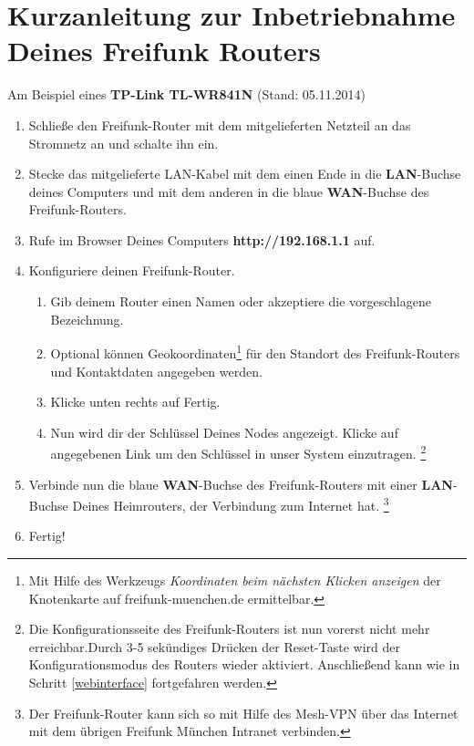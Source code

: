 \documentclass{article}
\newcommand{\changefont}[3]{
\fontfamily{#1} \fontseries{#2} \fontshape{#3} \selectfont}
\begin{document}
\changefont{phv}{m}{n}



\section*{Kurzanleitung zur Inbetriebnahme Deines Freifunk Routers}
Am Beispiel eines \textbf{TP-Link TL-WR841N} (Stand: 05.11.2014)

\begin{enumerate}
\item Schließe den Freifunk-Router mit dem mitgelieferten Netzteil an das 
    Stromnetz an und schalte ihn ein.

\item Stecke das mitgelieferte LAN-Kabel mit dem einen Ende in die \textbf{LAN}-Buchse deines Computers und mit dem anderen in die blaue \textbf{WAN}-Buchse des Freifunk-Routers.

\item Rufe im Browser Deines Computers \textbf{http://192.168.1.1} auf. \label{webinterface}

\item Konfiguriere deinen Freifunk-Router. 
\begin{enumerate}
  \item Gib deinem Router einen Namen oder akzeptiere die vorgeschlagene Bezeichnung.

  \item Optional können Geokoordinaten\footnote{Mit Hilfe des Werkzeugs \textit{Koordinaten beim nächsten Klicken anzeigen} der Knotenkarte auf freifunk-muenchen.de ermittelbar.} für den Standort des Freifunk-Routers und Kontaktdaten angegeben werden.

  \item Klicke unten rechts auf \glqq{}Fertig\grqq{}.

  \item Nun wird dir der Schlüssel Deines Nodes angezeigt.
  Klicke auf angegebenen Link um den Schlüssel in unser System einzutragen.
  \footnote{Die Konfigurationsseite des Freifunk-Routers ist nun vorerst nicht mehr erreichbar.Durch 3-5 sekündiges Drücken der Reset-Taste wird der Konfigurationsmodus des Routers wieder aktiviert. Anschließend kann wie in Schritt \ref{webinterface} fortgefahren werden.}
\end{enumerate}

\item Verbinde nun die blaue \textbf{WAN}-Buchse des Freifunk-Routers mit einer \textbf{LAN}-Buchse Deines Heimrouters, der Verbindung zum Internet hat. \footnote{Der Freifunk-Router kann sich so mit Hilfe des Mesh-VPN über das Internet mit dem übrigen Freifunk München Intranet verbinden.}

\item Fertig!
\end{enumerate}
\end{document}
